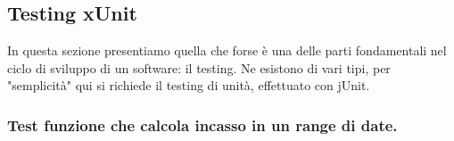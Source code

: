 \subsection{Testing xUnit}


\begin{flushleft}
    In questa sezione presentiamo quella che forse è una delle parti fondamentali nel ciclo di sviluppo di un software: il testing.
    Ne esistono di vari tipi, per "semplicità" qui si richiede il testing di unità, effettuato con jUnit.
\end{flushleft}

\subsubsection{Test funzione che calcola incasso in un range di date.}

